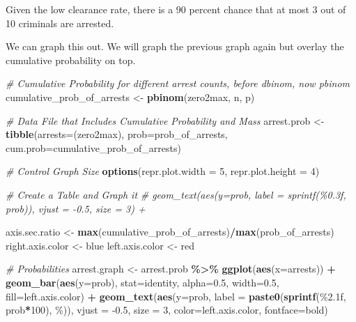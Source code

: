 \documentclass[
]{book}
\newenvironment{Shaded}{\begin{snugshade}}{\end{snugshade}}
\newcommand{\CommentTok}[1]{\textcolor[rgb]{0.56,0.35,0.01}{\textit{#1}}}
\newcommand{\DataTypeTok}[1]{\textcolor[rgb]{0.13,0.29,0.53}{#1}}
\newcommand{\DecValTok}[1]{\textcolor[rgb]{0.00,0.00,0.81}{#1}}
\newcommand{\FloatTok}[1]{\textcolor[rgb]{0.00,0.00,0.81}{#1}}
\newcommand{\KeywordTok}[1]{\textcolor[rgb]{0.13,0.29,0.53}{\textbf{#1}}}
\newcommand{\NormalTok}[1]{#1}
\newcommand{\OperatorTok}[1]{\textcolor[rgb]{0.81,0.36,0.00}{\textbf{#1}}}
\newcommand{\StringTok}[1]{\textcolor[rgb]{0.31,0.60,0.02}{#1}}
\begin{document}
Given the low clearance rate, there is a \(90\) percent chance that at most 3 out of 10 criminals are arrested.

We can graph this out. We will graph the previous graph again but overlay the cumulative probability on top.

\begin{Shaded}
\begin{Highlighting}[]
\CommentTok{\# Cumulative Probability for different arrest counts, before dbinom, now pbinom}
\NormalTok{cumulative\_prob\_of\_arrests \textless{}{-}}\StringTok{ }\KeywordTok{pbinom}\NormalTok{(zero2max, n, p)}

\CommentTok{\# Data File that Includes Cumulative Probability and Mass}
\NormalTok{arrest.prob \textless{}{-}}\StringTok{ }\KeywordTok{tibble}\NormalTok{(}\DataTypeTok{arrests=}\NormalTok{(zero2max), }\DataTypeTok{prob=}\NormalTok{prob\_of\_arrests, }\DataTypeTok{cum.prob=}\NormalTok{cumulative\_prob\_of\_arrests)}

\CommentTok{\# Control Graph Size}
\KeywordTok{options}\NormalTok{(}\DataTypeTok{repr.plot.width =} \DecValTok{5}\NormalTok{, }\DataTypeTok{repr.plot.height =} \DecValTok{4}\NormalTok{)}

\CommentTok{\# Create a Table and Graph it}
\CommentTok{\#     geom\_text(aes(y=prob, label = sprintf(\textquotesingle{}\%0.3f\textquotesingle{}, prob)), vjust = {-}0.5, size = 3) +}

\NormalTok{axis.sec.ratio \textless{}{-}}\StringTok{ }\KeywordTok{max}\NormalTok{(cumulative\_prob\_of\_arrests)}\OperatorTok{/}\KeywordTok{max}\NormalTok{(prob\_of\_arrests)}
\NormalTok{right.axis.color \textless{}{-}}\StringTok{ \textquotesingle{}blue\textquotesingle{}}
\NormalTok{left.axis.color \textless{}{-}}\StringTok{ \textquotesingle{}red\textquotesingle{}}

\CommentTok{\# Probabilities}
\NormalTok{arrest.graph \textless{}{-}}\StringTok{ }\NormalTok{arrest.prob }\OperatorTok{\%\textgreater{}\%}
\StringTok{    }\KeywordTok{ggplot}\NormalTok{(}\KeywordTok{aes}\NormalTok{(}\DataTypeTok{x=}\NormalTok{arrests)) }\OperatorTok{+}
\StringTok{    }\KeywordTok{geom\_bar}\NormalTok{(}\KeywordTok{aes}\NormalTok{(}\DataTypeTok{y=}\NormalTok{prob),}
             \DataTypeTok{stat=}\StringTok{\textquotesingle{}identity\textquotesingle{}}\NormalTok{, }\DataTypeTok{alpha=}\FloatTok{0.5}\NormalTok{, }\DataTypeTok{width=}\FloatTok{0.5}\NormalTok{, }\DataTypeTok{fill=}\NormalTok{left.axis.color) }\OperatorTok{+}
\StringTok{    }\KeywordTok{geom\_text}\NormalTok{(}\KeywordTok{aes}\NormalTok{(}\DataTypeTok{y=}\NormalTok{prob,}
                  \DataTypeTok{label =} \KeywordTok{paste0}\NormalTok{(}\KeywordTok{sprintf}\NormalTok{(}\StringTok{\textquotesingle{}\%2.1f\textquotesingle{}}\NormalTok{, prob}\OperatorTok{*}\DecValTok{100}\NormalTok{), }\StringTok{\textquotesingle{}\%\textquotesingle{}}\NormalTok{)),}
              \DataTypeTok{vjust =} \FloatTok{{-}0.5}\NormalTok{, }\DataTypeTok{size =} \DecValTok{3}\NormalTok{, }\DataTypeTok{color=}\NormalTok{left.axis.color, }\DataTypeTok{fontface=}\StringTok{\textquotesingle{}bold\textquotesingle{}}\NormalTok{)}


\end{Highlighting}
\end{Shaded}
\end{document}
